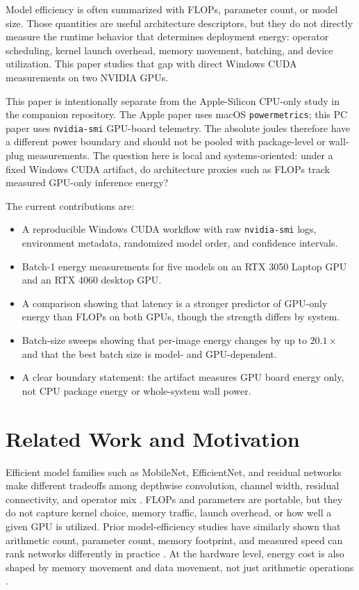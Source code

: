 \documentclass[conference]{IEEEtran}
\begin{document}
Model efficiency is often summarized with FLOPs, parameter count, or model
size. Those quantities are useful architecture descriptors, but they do not
directly measure the runtime behavior that determines deployment energy:
operator scheduling, kernel launch overhead, memory movement, batching, and
device utilization. This paper studies that gap with direct Windows CUDA
measurements on two NVIDIA GPUs.

This paper is intentionally separate from the Apple-Silicon CPU-only study in
the companion repository. The Apple paper uses macOS \texttt{powermetrics};
this PC paper uses \texttt{nvidia-smi} GPU-board telemetry. The absolute joules
therefore have a different power boundary and should not be pooled with
package-level or wall-plug measurements. The question here is local and
systems-oriented: under a fixed Windows CUDA artifact, do architecture proxies
such as FLOPs track measured GPU-only inference energy?

The current contributions are:
\begin{itemize}
\item A reproducible Windows CUDA workflow with raw \texttt{nvidia-smi} logs,
environment metadata, randomized model order, and confidence intervals.
\item Batch-1 energy measurements for five models on an RTX 3050 Laptop GPU
and an RTX 4060 desktop GPU.
\item A comparison showing that latency is a stronger predictor of GPU-only
energy than FLOPs on both GPUs, though the strength differs by system.
\item Batch-size sweeps showing that per-image energy changes by up to
$20.1\times$ and that the best batch size is model- and GPU-dependent.
\item A clear boundary statement: the artifact measures GPU board energy only,
not CPU package energy or whole-system wall power.
\end{itemize}

\section{Related Work and Motivation}

Efficient model families such as MobileNet, EfficientNet, and residual
networks make different tradeoffs among depthwise convolution, channel width,
residual connectivity, and operator mix \cite{mobilenetv2,efficientnet,resnet}.
FLOPs and parameters are portable, but they do not capture kernel choice,
memory traffic, launch overhead, or how well a given GPU is utilized.
Prior model-efficiency studies have similarly shown that arithmetic count,
parameter count, memory footprint, and measured speed can rank networks
differently in practice \cite{canziani}. At the hardware level, energy cost is
also shaped by memory movement and data movement, not just arithmetic
operations \cite{horowitz}.
\end{document}
